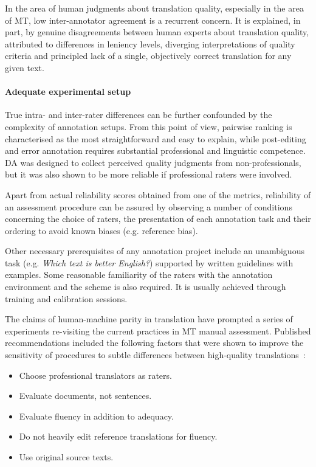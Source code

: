 In the area of human judgments about translation quality, especially in the area of MT, low inter-annotator agreement is a recurrent concern. It is explained, in part, by genuine disagreements between human experts about translation  quality, attributed to differences in leniency levels, diverging interpretations of quality criteria and principled lack of a single, objectively correct translation for any given text. 

\paragraph{Adequate experimental setup} 
True intra- and inter-rater differences can be further confounded by the complexity of annotation setups. From this point of view, pairwise ranking is characterised as the most straightforward and easy to explain, while post-editing and error annotation requires substantial professional and linguistic competence. \gls{DA} was designed to collect perceived quality judgments from non-professionals, but it was also shown to be more reliable if professional raters were involved. 

Apart from actual reliability scores obtained from one of the metrics, reliability of an assessment procedure can be assured by observing a number of conditions concerning the choice of raters, the presentation of each annotation task and their ordering to avoid known biases (e.g. reference bias).

Other necessary prerequisites of any annotation project include an unambiguous task (e.g. \emph{Which text is better English?}) supported by written guidelines with examples. Some reasonable familiarity of the raters with the annotation environment and the scheme is also required. It is usually achieved through training and calibration sessions. 

The claims of human-machine parity in translation have prompted a series of experiments re-visiting the current practices in MT manual assessment. Published recommendations included the following factors that were shown to improve the sensitivity of procedures to subtle differences between high-quality translations~\cite{Laubli2020}:

\begin{itemize}\compresslist{}
	\item Choose professional translators as raters.
	\item Evaluate documents, not sentences.
	\item Evaluate fluency in addition to adequacy.
	\item Do not heavily edit reference translations for fluency.
	\item Use original source texts.
\end{itemize}

